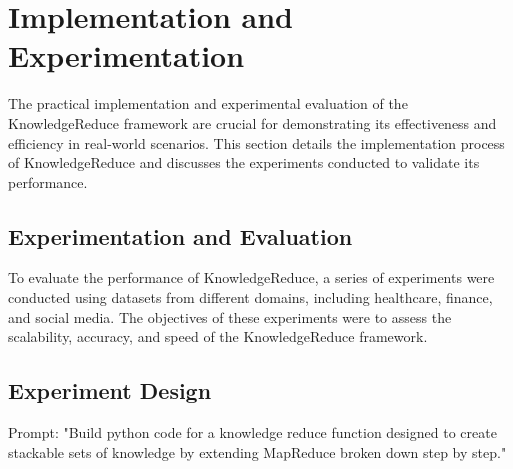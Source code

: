 \documentclass{article}
\begin{document}
\section{Implementation and Experimentation}
The practical implementation and experimental evaluation of the KnowledgeReduce framework are crucial for demonstrating its effectiveness and efficiency in real-world scenarios. This section details the implementation process of KnowledgeReduce and discusses the experiments conducted to validate its performance.

\subsection{Experimentation and Evaluation}

To evaluate the performance of KnowledgeReduce, a series of experiments were conducted using datasets from different domains, including healthcare, finance, and social media. The objectives of these experiments were to assess the scalability, accuracy, and speed of the KnowledgeReduce framework.

\subsection{Experiment Design}

Prompt: "Build python code for a knowledge reduce function designed to create stackable sets of knowledge by extending MapReduce broken down step by step."
\end{document}
